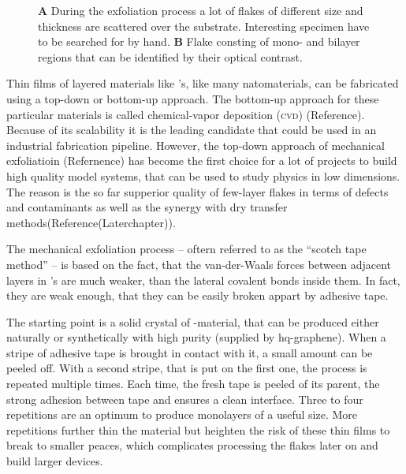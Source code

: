 \begin{figure}
\begin{subfigure}{0.349\textwidth}
\end{subfigure}
\caption{\textbf{A} During the exfoliation process a lot of flakes of different size and thickness are scattered over the substrate. Interesting specimen have to be searched for by hand. \textbf{B} Flake consting of mono- and bilayer regions that can be identified by their optical contrast.}
	\label{flakes}
\end{figure}
Thin films of layered materials like \tmd's, like many natomaterials, can be fabricated using a top-down or bottom-up approach. The bottom-up approach for these particular materials is called chemical-vapor deposition (\textsc{cvd}) (Reference). Because of its scalability it is the leading candidate that could be used in an industrial fabrication pipeline. However, the top-down approach of mechanical exfoliatioin (Refernence) has become the first choice for a lot of projects to build high quality model systems, that can be used to study physics in low dimensions. The reason is the so far supperior quality of few-layer flakes in terms of defects and contaminants as well as the synergy with dry transfer methods(Reference(Laterchapter)). 

The mechanical exfoliation process -- oftern referred to as the ``scotch tape method'' -- is based on the fact, that the van-der-Waals forces between adjacent layers in \tmd's are much weaker, than the lateral covalent bonds inside them. In fact, they are weak enough, that they can be easily broken appart by adhesive tape.

The starting point is a solid crystal of \tmd-material, that can be produced either naturally or synthetically with high purity (supplied by hq-graphene). When a stripe of adhesive tape is brought in contact with it, a small amount can be peeled off. With a second stripe, that is put on the first one, the process is repeated multiple times. Each time, the fresh tape is peeled of its parent, the strong adhesion between tape and \tmdg ensures a clean interface. Three to four repetitions are an optimum to produce monolayers of a useful size. More repetitions further thin the material but heighten the risk of these thin films to break to smaller peaces, which complicates processing the flakes later on and build larger devices. 

